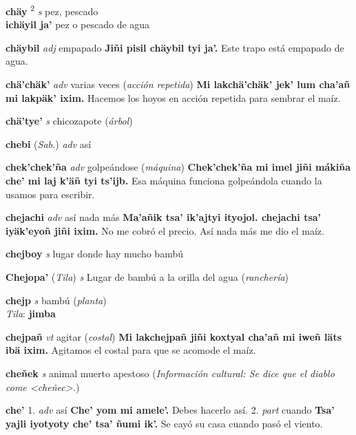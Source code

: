 \documentclass[10pt]{scrbook}
\newcommand{\entry}[1]{\textbf{#1}}
\newcommand{\onedefinition}[1]{#1.}
\newcommand{\defsuperscript}[1]{\textsuperscript{#1}}
\newcommand{\partofspeech}[1]{\textit{#1}}
\newcommand{\spanishtranslation}[1]{#1}
\newcommand{\clarification}[1]{(\textit{#1})}
\newcommand{\cholexample}[1]{\textbf{#1}}
\newcommand{\exampletranslation}[1]{#1}
\newcommand{\dialectvariant}[1]{\\\textit{#1}:}
\newcommand{\dialectword}[1]{\textbf{#1}}
\newcommand{\relevantdialect}[1]{(\textit{#1})}
\newcommand{\culturalinformation}[1]{(\textit{#1})}
\newcommand{\secondaryentry}[1]{\\\textbf{#1}}
\newcommand{\secondtranslation}[1]{#1}
\begin{document}
\begin{multicols}{2}
\entry{chäy}
\defsuperscript{2}
\partofspeech{s}
\spanishtranslation{pez, pescado}
\secondaryentry{ichäyil ja'}
\secondtranslation{pez o pescado de agua}

\entry{chäybil}
\partofspeech{adj}
\spanishtranslation{empapado}
\cholexample{Jiñi pisil chäybil tyi ja'.}
\exampletranslation{Este trapo está empapado de agua.}

\entry{chä'chäk'}
\partofspeech{adv}
\spanishtranslation{varias veces}
\clarification{acción repetida}
\cholexample{Mi lakchä'chäk' jek' lum cha'añ mi lakpäk' ixim.}
\exampletranslation{Hacemos los hoyos en acción repetida para sembrar el maíz.}

\entry{chä'tye'}
\partofspeech{s}
\spanishtranslation{chicozapote}
\clarification{árbol}

\entry{chebi}
\relevantdialect{Sab.}
\partofspeech{adv}
\spanishtranslation{así}

\entry{chek'chek'ña}
\partofspeech{adv}
\spanishtranslation{golpeándose}
\clarification{máquina}
\cholexample{Chek'chek'ña mi imel jiñi mákiña che' mi laj k'äñ tyi ts'ijb.}
\exampletranslation{Esa máquina funciona golpeándola cuando la usamos para escribir.}

\entry{chejachi}
\partofspeech{adv}
\spanishtranslation{así nada más}
\cholexample{Ma'añik tsa' ik'ajtyi ityojol. chejachi tsa' iyäk'eyoñ jiñi ixim.}
\exampletranslation{No me cobró el precio. Así nada más me dio el maíz.}

\entry{chejboy}
\partofspeech{s}
\spanishtranslation{lugar donde hay mucho bambú}

\entry{Chejopa'}
\relevantdialect{Tila}
\partofspeech{s}
\spanishtranslation{Lugar de bambú a la orilla del agua}
\clarification{ranchería}

\entry{chejp}
\partofspeech{s}
\spanishtranslation{bambú}
\clarification{planta}
\dialectvariant{Tila}
\dialectword{jimba}

\entry{chejpañ}
\partofspeech{vt}
\spanishtranslation{agitar}
\clarification{costal}
\cholexample{Mi lakchejpañ jiñi koxtyal cha'añ mi iweñ läts ibä ixim.}
\exampletranslation{Agitamos el costal para que se acomode el maíz.}

\entry{cheñek}
\partofspeech{s}
\spanishtranslation{animal muerto apestoso}
\culturalinformation{Información cultural: Se dice que el diablo come <cheñec>.}

\entry{che'}
\onedefinition{1}
\partofspeech{adv}
\spanishtranslation{así}
\cholexample{Che' yom mi amele'.}
\exampletranslation{Debes hacerlo así.}
\onedefinition{2}
\partofspeech{part}
\spanishtranslation{cuando}
\cholexample{Tsa' yajli iyotyoty che' tsa' ñumi ik'.}
\exampletranslation{Se cayó su casa cuando pasó el viento.}


\end{multicols}
\end{document}
